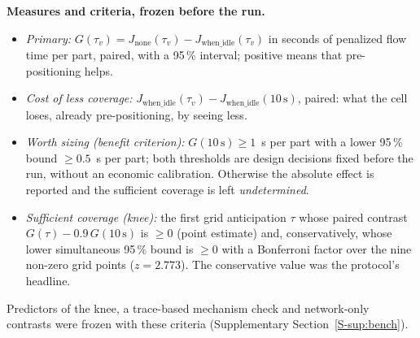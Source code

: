 \documentclass[11pt,a4paper]{article}
\newcommand{\tv}{\tau_{v}}
\newcommand{\supsec}[1]{Supplementary Section~\ref{S-#1}}
\begin{document}
\textbf{Measures and criteria, frozen before the run.}
\begin{itemize}[nosep]
\item \emph{Primary:} $G(\tv)=J_{\mathrm{none}}(\tv)-J_{\mathrm{when\_idle}}(\tv)$ in
  seconds of penalized flow time per part, paired, with a 95\,\% interval; positive means
  that pre-positioning helps.
\item \emph{Cost of less coverage:} $J_{\mathrm{when\_idle}}(\tv)-J_{\mathrm{when\_idle}}(10\,\mathrm{s})$,
  paired: what the cell loses, already pre-positioning, by seeing less.
\item \emph{Worth sizing (benefit criterion):} $G(10\,\mathrm{s})\ge1$~s per part with a
  lower 95\,\% bound $\ge0.5$~s per part; both thresholds are design decisions fixed before
  the run, without an economic calibration. Otherwise the absolute effect is reported and
  the sufficient coverage is left \emph{undetermined}.
\item \emph{Sufficient coverage (knee):} the first grid anticipation $\tau$ whose paired
  contrast $G(\tau)-0.9\,G(10\,\mathrm{s})$ is $\ge0$ (point estimate) and, conservatively,
  whose lower simultaneous 95\,\% bound is $\ge0$ with a Bonferroni factor over the nine
  non-zero grid points ($z=2.773$). The conservative value was the protocol's headline.
\end{itemize}
Predictors of the knee, a trace-based mechanism check and network-only contrasts were
frozen with these criteria (\supsec{sup:bench}).
\end{document}

